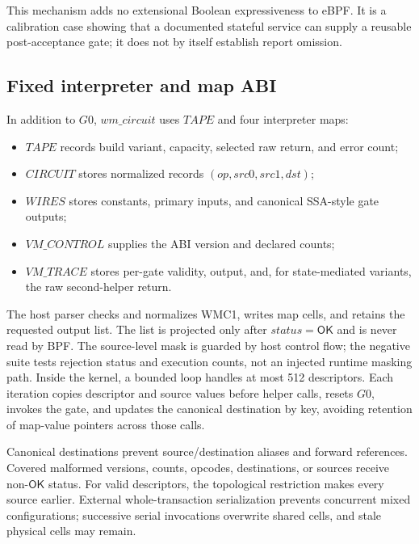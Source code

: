 \documentclass[conference]{IEEEtran}
\begin{document}
This mechanism adds no extensional Boolean expressiveness to eBPF. It is a calibration case showing that a documented stateful service can supply a reusable post-acceptance gate; it does not by itself establish report omission.

\subsection{Fixed interpreter and map ABI}

In addition to $G0$, $\mathit{wm\_circuit}$ uses $\mathit{TAPE}$ and four interpreter maps:

\begin{itemize}
\item $\mathit{TAPE}$ records build variant, capacity, selected raw return, and error count;
\item $\mathit{CIRCUIT}$ stores normalized records $(\mathit{op},\mathit{src0},\mathit{src1},\mathit{dst})$;
\item $\mathit{WIRES}$ stores constants, primary inputs, and canonical SSA-style gate outputs;
\item $\mathit{VM\_CONTROL}$ supplies the ABI version and declared counts;
\item $\mathit{VM\_TRACE}$ stores per-gate validity, output, and, for state-mediated variants, the raw second-helper return.
\end{itemize}

The host parser checks and normalizes WMC1, writes map cells, and retains the requested output list. The list is projected only after $\mathit{status}=\mathsf{OK}$ and is never read by BPF. The source-level mask is guarded by host control flow; the negative suite tests rejection status and execution counts, not an injected runtime masking path. Inside the kernel, a bounded loop handles at most 512 descriptors. Each iteration copies descriptor and source values before helper calls, resets $G0$, invokes the gate, and updates the canonical destination by key, avoiding retention of map-value pointers across those calls.

Canonical destinations prevent source/destination aliases and forward references. Covered malformed versions, counts, opcodes, destinations, or sources receive non-$\mathsf{OK}$ status. For valid descriptors, the topological restriction makes every source earlier. External whole-transaction serialization prevents concurrent mixed configurations; successive serial invocations overwrite shared cells, and stale physical cells may remain.
\end{document}
